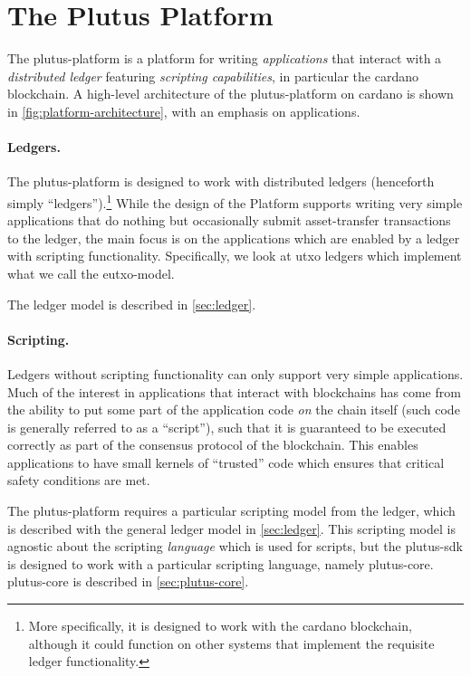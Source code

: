 \section{The Plutus Platform}

The \gls{plutus-platform} is a platform for writing \emph{applications} that interact with a \emph{distributed ledger} featuring \emph{scripting capabilities}, in particular the \gls{cardano} blockchain.
A high-level architecture of the \gls{plutus-platform} on \gls{cardano} is shown in \cref{fig:platform-architecture}, with an emphasis on applications.

\paragraph{Ledgers.}
The \gls{plutus-platform} is designed to work with distributed ledgers (henceforth simply ``ledgers'').\footnote{
More specifically, it is designed to work with the \gls{cardano} blockchain, although it could function on other systems that implement the requisite ledger functionality.
}
While the design of the Platform supports writing very simple applications that do nothing but occasionally submit asset-transfer transactions to the ledger, the main focus is on the applications which are enabled by a ledger with scripting functionality.
Specifically, we look at \gls{utxo} ledgers which implement what we call the \gls{eutxo-model}.

The ledger model is described in \cref{sec:ledger}.

\paragraph{Scripting.}
Ledgers without scripting functionality can only support very simple applications.
Much of the interest in applications that interact with blockchains has come from the ability to put some part of the application code \emph{on} the chain itself (such code is generally referred to as a ``\gls{script}''), such that it is guaranteed to be executed correctly as part of the consensus protocol of the blockchain.
This enables applications to have small kernels of ``trusted'' code which ensures that critical safety conditions are met.

The \gls{plutus-platform} requires a particular scripting model from the ledger, which is described with the general ledger model in \cref{sec:ledger}.
This scripting model is agnostic about the scripting \emph{language} which is used for \glspl{script}, but the \gls{plutus-sdk} is designed to work with a particular scripting language, namely \gls{plutus-core}. \Gls{plutus-core} is described in \cref{sec:plutus-core}.


